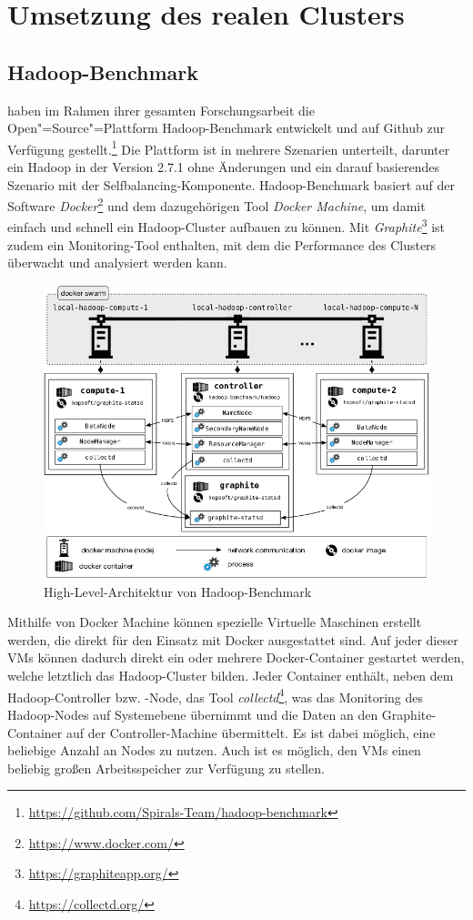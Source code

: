 \section{Umsetzung des realen Clusters}\label{sec:aufbauCluster}

\subsection{Hadoop-Benchmark}\label{sec:hadoopBenchmark}

\citeauthor{zhang2016} haben im Rahmen ihrer gesamten Forschungsarbeit die Open"=Source"=Plattform Hadoop-Benchmark entwickelt und auf Github zur Verfügung gestellt.\footnote{\url{https://github.com/Spirals-Team/hadoop-benchmark}} Die Plattform ist in mehrere Szenarien unterteilt, darunter ein Hadoop in der Version 2.7.1 ohne Änderungen und ein darauf basierendes Szenario mit der Selfbalancing-Komponente. Hadoop-Benchmark basiert auf der Software \emph{Docker}\footnote{\url{https://www.docker.com/}} und dem dazugehörigen Tool \emph{Docker Machine}, um damit einfach und schnell ein Hadoop-Cluster aufbauen zu können. Mit \emph{Graphite}\footnote{\url{https://graphiteapp.org/}} ist zudem ein Monitoring-Tool enthalten, mit dem die Performance des Clusters überwacht und analysiert werden kann.

\begin{figure}
    \centering
    \includegraphics[width=.8\columnwidth]{./images/hadoopBenchmarkArch.png}
    \caption[High-Level-Architektur von Hadoop-Benchmark]{High-Level-Architektur von Hadoop-Benchmark \cite{abb:hadoopBenchmarkArch}}
    \label{fig:hadoopBenchmarkArchitecture}
\end{figure}

Mithilfe von Docker Machine können spezielle Virtuelle Maschinen erstellt werden, die direkt für den Einsatz mit Docker ausgestattet sind. Auf jeder dieser VMs können dadurch direkt ein oder mehrere Docker-Container gestartet werden, welche letztlich das Hadoop-Cluster bilden. Jeder Container enthält, neben dem Hadoop-Controller bzw. -Node, das Tool \emph{collectd}\footnote{\url{https://collectd.org/}}, was das Monitoring des Hadoop-Nodes auf Systemebene übernimmt und die Daten an den Graphite-Container auf der Controller-Machine übermittelt. Es ist dabei möglich, eine beliebige Anzahl an Nodes zu nutzen. Auch ist es möglich, den VMs einen beliebig großen Arbeitsspeicher zur Verfügung zu stellen.

